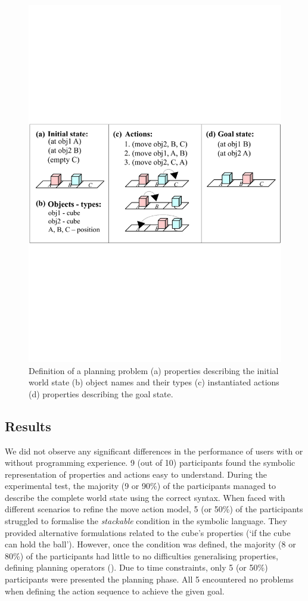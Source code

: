 \begin{figure}[ht]
	\centering
	\includegraphics[width=0.7\linewidth]{figures/planning-permutation}
	\caption{Definition of a planning problem (a) properties describing the initial world state (b) object names and their types (c) instantiated actions (d) properties describing the goal state.}
	\label{fig:planning-permutation}
\end{figure}


\subsection{Results}
We did not observe any significant differences in the performance of users with or without programming experience.
9 (out of 10) participants found the symbolic representation of properties and actions easy to understand.
During the experimental test, the majority (9 or 90\%) of the participants managed to describe the complete world state using the correct syntax.
When faced with different scenarios to refine the move action model, 5 (or 50\%) of the participants struggled to formalise the \textit{stackable} condition in the symbolic language.
They provided alternative formulations related to the cube's properties (\eg `if the cube can hold the ball').
However, once the condition was defined, the majority (8 or 80\%) of the participants had little to no difficulties generalising properties, \eg defining planning operators ().
Due to time constraints, only 5 (or 50\%) participants were presented the planning phase.
All 5 encountered no problems when defining the action sequence to achieve the given goal.

